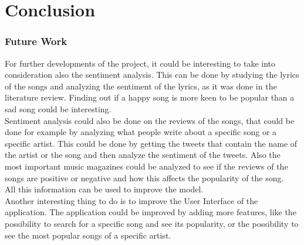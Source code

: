 \chapter{Conclusion}

\subsection{Future Work}
For further developments of the project, it could be interesting to take into consideration also the sentiment analysis.
This can be done by studying the lyrics of the songs and analyzing the sentiment of the lyrics, as it was done in the literature review. 
Finding out if a happy song is more keen to be popular than a sad song could be interesting.\\
Sentiment analysis could also be done on the reviews of the songs,
that could be done for example by analyzing what people write about a specific song or a specific artist. This could be done by getting the tweets that contain the name of the artist or the song and then analyze the sentiment of the tweets. Also the most important music magazines could be analyzed to see if the reviews of the songs are positive or negative and how this affects the popularity of the song.\\
All this information can be used to improve the model.\\
Another interesting thing to do is to improve the User Interface of the application. The application could be improved by adding more features, like the possibility to search for a specific song and see its popularity, or the possibility to see the most popular songs of a specific artist.\\



